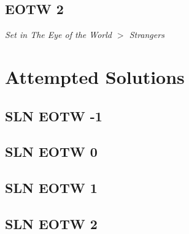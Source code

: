 \documentclass{article}
\begin{document}
\subsection*{EOTW 2}
\textit{ Set in The Eye of the World $>$ Strangers }  \pagebreak

\section*{Attempted Solutions}

\subsection*{SLN EOTW -1}
 \pagebreak

\subsection*{SLN EOTW 0}
 \pagebreak

\subsection*{SLN EOTW 1}
 \pagebreak

\subsection*{SLN EOTW 2}
\end{document}
